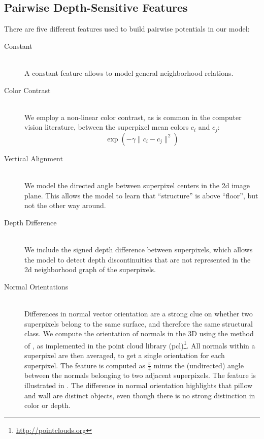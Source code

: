 \documentclass[a4paper, 10pt, conference]{ieeeconf}      %
\begin{document}
\subsection{Pairwise Depth-Sensitive Features}
There are five different features used to build pairwise potentials in our model:
\begin{description}
    \item[Constant] \hfill \\
        A constant feature allows to model general neighborhood relations.

    \item[Color Contrast] \hfill \\
        We employ a non-linear color contrast, as is common in the computer
        vision literature, between the superpixel mean colors $c_i$ and $c_j$:
        \[\exp\left(-\gamma \lVert c_i - c_j \rVert^2\right)\]

    \item[Vertical Alignment] \hfill \\
        We model the directed angle between superpixel centers in the 2d image
        plane.  This allows the  model to learn that ``structure'' is above
        ``floor'', but not the other way around.

    \item[Depth Difference] \hfill \\
        We include the signed depth difference between superpixels, which
        allows the model to detect depth discontinuities that are not
        represented in the 2d neighborhood graph of the superpixels.

    \item[Normal Orientations] \hfill \\
        Differences in normal vector orientation are a strong clue on
        whether two superpixels belong to the same surface, and therefore the
        same structural class.
        We compute the orientation of normals in the 3D using the method of \citet{holz_2011_robocup},
        as implemented in the point cloud library (pcl)\footnote{\url{http://pointclouds.org}}.
        All normals within a superpixel are then averaged, to get a single orientation for each superpixel.
        The feature is computed as $\frac{\pi}{4}$ minus the (undirected) angle between the normals belonging
        to two adjacent superpixels.  
        The feature is illustrated in . The difference
        in normal orientation highlights that pillow and wall are distinct
        objects, even though there is no strong distinction in color or depth.
\end{description}
\end{document}
